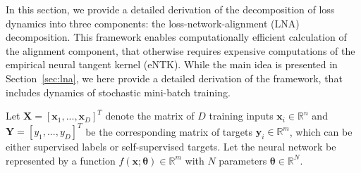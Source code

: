 In this section, we provide a detailed derivation of the decomposition of loss dynamics into three components: the loss-network-alignment (LNA) decomposition. This framework enables computationally efficient calculation of the alignment component, that otherwise requires expensive computations of the empirical neural tangent kernel (eNTK).
While the main idea is presented in Section~\ref{sec:lna}, we here provide a detailed derivation of the framework, that includes dynamics of stochastic mini-batch training.

Let \(\mathbf{X}=[\mathbf{x}_1, ..., \mathbf{x}_D]^T\) denote the matrix of \(D\) training inputs \(\mathbf{x}_i \in \mathbb{R}^n\) and \(\mathbf{Y}=[y_1, ..., y_D]^T\) be the corresponding matrix of targets \(\mathbf{y}_i \in \mathbb{R}^m\), which can be either supervised labels or self-supervised targets.
Let the neural network be represented by a function \(f(\mathbf{x}; \boldsymbol{\theta}) \in \mathbb{R}^m\) with \(N\) parameters \(\boldsymbol{\theta} \in \mathbb{R}^N\).

